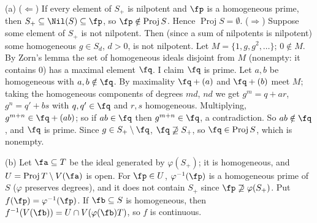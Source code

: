 \documentclass[11pt]{article}
\begin{document}
(a) ($\Leftarrow$) If every element of $S_+$ is nilpotent and $\fp$ is a homogeneous prime, then $S_+\subseteq\Nil(S)\subseteq\fp$, so $\fp\notin\operatorname{Proj}S$. Hence $\operatorname{Proj}S=\emptyset$.
($\Rightarrow$) Suppose some element of $S_+$ is not nilpotent. Then (since a sum of nilpotents is nilpotent) some homogeneous $g\in S_d$, $d>0$, is not nilpotent. Let $M=\{1,g,g^2,\dots\}$; $0\notin M$. By Zorn's lemma the set of homogeneous ideals disjoint from $M$ (nonempty: it contains $0$) has a maximal element $\fq$. I claim $\fq$ is prime. Let $a,b$ be homogeneous with $a,b\notin\fq$. By maximality $\fq+(a)$ and $\fq+(b)$ meet $M$; taking the homogeneous components of degrees $md$, $nd$ we get $g^m=q+ar$, $g^n=q'+bs$ with $q,q'\in\fq$ and $r,s$ homogeneous. Multiplying, $g^{m+n}\in\fq+(ab)$; so if $ab\in\fq$ then $g^{m+n}\in\fq$, a contradiction. So $ab\notin\fq$, and $\fq$ is prime. Since $g\in S_+\setminus\fq$, $\fq\not\supseteq S_+$, so $\fq\in\operatorname{Proj}S$, which is nonempty.

(b) Let $\fa\subseteq T$ be the ideal generated by $\varphi(S_+)$; it is homogeneous, and $U=\operatorname{Proj}T\setminus V(\fa)$ is open. For $\fp\in U$, $\varphi^{-1}(\fp)$ is a homogeneous prime of $S$ ($\varphi$ preserves degrees), and it does not contain $S_+$ since $\fp\not\supseteq\varphi(S_+)$. Put $f(\fp)=\varphi^{-1}(\fp)$. If $\fb\subseteq S$ is homogeneous, then $f^{-1}(V(\fb))=U\cap V(\varphi(\fb)T)$, so $f$ is continuous.
\end{document}

